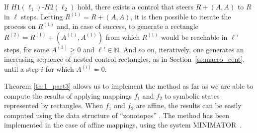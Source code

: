 If $H1(\ell_1)$-$H2(\ell_2)$ hold, there exists a control that
steers $R+(A,A)$ to $R$ in $\ell$ steps.
Letting $R^{(1)}=R+(A,A)$, it is then possible to iterate the process
on $R^{(1)}$ and, in case of success, 
to generate a rectangle $R^{(2)}=R^{(1)}+(A^{(1)},A^{(1)})$ 
from which $R^{(1)}$ would be
reachable in $\ell'$ steps, for some $A^{(1)}\geq 0$ and $\ell'\in\mathbb{N}$.
And so on, iteratively, one generates
an increasing  sequence of nested control rectangles,
as in Section~\ref{ss:macro_cent}, until a step $i$ for which 
$A^{(i)}=0$.

Theorem \ref{th:1_part3} allows us to implement the method as far as we are able to compute the results of applying mappings $f_1$ and $f_2$ to symbolic states represented by rectangles. 
When $f_1$ and $f_2$ are affine, the results
can be easily computed using the data structure of
``zonotopes'' \cite{Girard05}. The method has been implemented in the case of affine
mappings, using the system MINIMATOR~\cite{minimator,fribourg2014finite}.


